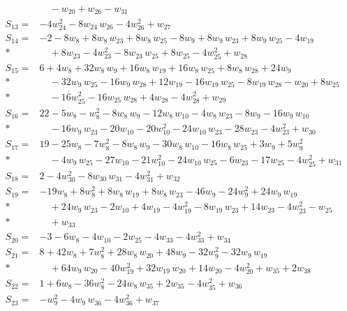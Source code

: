 \documentclass[11pt]{article}
\theoremstyle{remark}\newtheorem{remark}[theorem]{Remark}
\begin{document}
\begin{align*}
&\quad  - w_{20} + w_{26} - w_{31} \\[2pt]
S_{13}={}& -4w_{24}^{2} - 8w_{24}\,w_{26} - 4w_{26}^{2} + w_{27} \\[2pt]
S_{14}={}& -2 - 8w_{8} + 8w_{8}\,w_{23} + 8w_{8}\,w_{25} - 8w_{9} + 8w_{9}\,w_{23} + 8w_{9}\,w_{25} - 4w_{19} \\*
&\quad  + 8w_{23} - 4w_{23}^{2} - 8w_{23}\,w_{25} + 8w_{25} - 4w_{25}^{2} + w_{28} \\[2pt]
S_{15}={}& 6 + 4w_{8} + 32w_{8}\,w_{9} + 16w_{8}\,w_{19} + 16w_{8}\,w_{25} + 8w_{8}\,w_{28} + 24w_{9} \\*
&\quad  - 32w_{9}\,w_{25} - 16w_{9}\,w_{28} + 12w_{19} - 16w_{19}\,w_{25} - 8w_{19}\,w_{28} - w_{20} + 8w_{25} \\*
&\quad  - 16w_{25}^{2} - 16w_{25}\,w_{28} + 4w_{28} - 4w_{28}^{2} + w_{29} \\[2pt]
S_{16}={}& 22 - 5w_{8} - w_{8}^{2} - 8w_{8}\,w_{9} - 12w_{8}\,w_{10} - 4w_{8}\,w_{23} - 8w_{9} - 16w_{9}\,w_{10} \\*
&\quad  - 16w_{9}\,w_{23} - 20w_{10} - 20w_{10}^{2} - 24w_{10}\,w_{23} - 28w_{23} - 4w_{23}^{2} + w_{30} \\[2pt]
S_{17}={}& 19 - 25w_{8} - 7w_{8}^{2} - 8w_{8}\,w_{9} - 30w_{8}\,w_{10} - 16w_{8}\,w_{25} + 3w_{9} + 5w_{9}^{2} \\*
&\quad  - 4w_{9}\,w_{25} - 27w_{10} - 21w_{10}^{2} - 24w_{10}\,w_{25} - 6w_{23} - 17w_{25} - 4w_{25}^{2} + w_{31} \\[2pt]
S_{18}={}& 2 - 4w_{30}^{2} - 8w_{30}\,w_{31} - 4w_{31}^{2} + w_{32} \\[2pt]
S_{19}={}& -19w_{8} + 8w_{8}^{2} + 8w_{8}\,w_{19} + 8w_{8}\,w_{23} - 46w_{9} - 24w_{9}^{2} + 24w_{9}\,w_{19} \\*
&\quad  + 24w_{9}\,w_{23} - 2w_{10} + 4w_{19} - 4w_{19}^{2} - 8w_{19}\,w_{23} + 14w_{23} - 4w_{23}^{2} - w_{25} \\*
&\quad  + w_{33} \\[2pt]
S_{20}={}& -3 - 6w_{8} - 4w_{10} - 2w_{25} - 4w_{33} - 4w_{33}^{2} + w_{34} \\[2pt]
S_{21}={}& 8 + 42w_{8} + 7w_{8}^{2} + 28w_{8}\,w_{20} + 48w_{9} - 32w_{9}^{2} - 32w_{9}\,w_{19} \\*
&\quad  + 64w_{9}\,w_{20} - 40w_{19}^{2} + 32w_{19}\,w_{20} + 14w_{20} - 4w_{20}^{2} + w_{35} + 2w_{38} \\[2pt]
S_{22}={}& 1 + 6w_{8} - 36w_{8}^{2} - 24w_{8}\,w_{35} + 2w_{35} - 4w_{35}^{2} + w_{36} \\[2pt]
S_{23}={}& -w_{9}^{2} - 4w_{9}\,w_{36} - 4w_{36}^{2} + w_{37} \\[2pt]

\end{align*}
\end{document}
